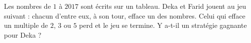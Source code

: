 \documentclass[varwidth]{standalone}
\begin{document}
    Les nombres de $1$ \`a $2017$ sont \'ecrits sur un tableau. Deka et Farid jouent au jeu suivant : chacun d'entre eux, \`a son tour, efface un des nombres. Celui qui efface un multiple de $2$, $3$ ou $5$ perd et le jeu se termine. Y a-t-il un strat\'egie gagnante pour Deka ?
\end{document}
